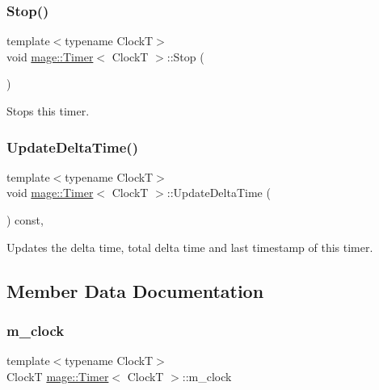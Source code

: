 \subsubsection{\texorpdfstring{Stop()}{Stop()}}
{\footnotesize\ttfamily template$<$typename ClockT$>$ \\
void \hyperlink{classmage_1_1_timer}{mage\+::\+Timer}$<$ ClockT $>$\+::Stop (\begin{DoxyParamCaption}{ }\end{DoxyParamCaption})\hspace{0.3cm}{\ttfamily [noexcept]}}

Stops this timer. \hypertarget{classmage_1_1_timer_a05cbba0b368e49cdf4bfebfd840e4118}{}\label{classmage_1_1_timer_a05cbba0b368e49cdf4bfebfd840e4118} 
\subsubsection{\texorpdfstring{Update\+Delta\+Time()}{UpdateDeltaTime()}}
{\footnotesize\ttfamily template$<$typename ClockT$>$ \\
void \hyperlink{classmage_1_1_timer}{mage\+::\+Timer}$<$ ClockT $>$\+::Update\+Delta\+Time (\begin{DoxyParamCaption}{ }\end{DoxyParamCaption}) const\hspace{0.3cm}{\ttfamily [private]}, {\ttfamily [noexcept]}}

Updates the delta time, total delta time and last timestamp of this timer. 

\subsection{Member Data Documentation}
\hypertarget{classmage_1_1_timer_ad46016090f9ae8a282398d8fcc8e9e0e}{}\label{classmage_1_1_timer_ad46016090f9ae8a282398d8fcc8e9e0e} 
\subsubsection{\texorpdfstring{m\+\_\+clock}{m\_clock}}
{\footnotesize\ttfamily template$<$typename ClockT$>$ \\
ClockT \hyperlink{classmage_1_1_timer}{mage\+::\+Timer}$<$ ClockT $>$\+::m\+\_\+clock\hspace{0.3cm}{\ttfamily [private]}}

